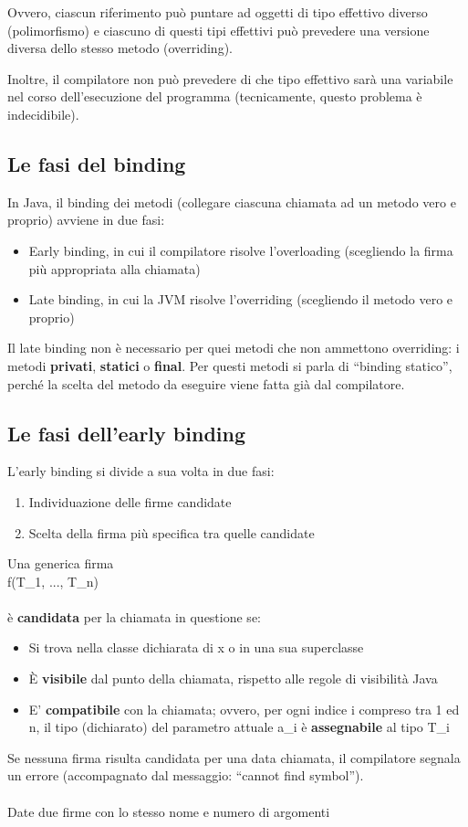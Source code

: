 \documentclass[10pt]{article}
\begin{document}
Ovvero, ciascun riferimento può puntare ad oggetti di tipo effettivo diverso (polimorfismo) e ciascuno di questi tipi effettivi può prevedere una versione diversa dello stesso metodo (overriding). 

Inoltre, il compilatore non può prevedere di che tipo effettivo sarà una variabile nel corso dell'esecuzione del programma (tecnicamente, questo problema è indecidibile).
\subsection{Le fasi del binding}
In Java, il binding dei metodi (collegare ciascuna chiamata ad un metodo vero e proprio) avviene in 
due fasi:
\begin{itemize}
    \item Early binding, in cui il compilatore risolve l'overloading (scegliendo la firma più appropriata alla chiamata)
    \item Late binding, in cui la JVM risolve l'overriding (scegliendo il metodo vero e proprio)
\end{itemize}
Il late binding non è necessario per quei metodi che non ammettono overriding: i metodi \textbf{privati}, \textbf{statici} o \textbf{final}.
Per questi metodi si parla di “binding statico”, perché la scelta del metodo da eseguire viene fatta già dal compilatore.
\subsection{Le fasi dell'early binding}
L'early binding si divide a sua volta in due fasi:
\begin{enumerate}
    \item  Individuazione delle firme candidate
    \item Scelta della firma più specifica tra quelle candidate
\end{enumerate}
Una generica firma\\

f(T\_1, ..., T\_n)\\\\
è \textbf{candidata} per la chiamata in questione se:
\begin{itemize}
    \item Si trova nella classe dichiarata di x o in una sua superclasse
    \item  È \textbf{visibile} dal punto della chiamata, rispetto alle regole di visibilità Java
    \item E' \textbf{compatibile} con la chiamata; ovvero, per ogni indice i compreso tra 1 ed n, il tipo (dichiarato) del parametro attuale a\_i è \textbf{assegnabile} al tipo T\_i
\end{itemize}
Se nessuna firma risulta candidata per una data chiamata, il compilatore segnala un errore (accompagnato dal messaggio: “cannot find symbol”).\\\\
Date due firme con lo stesso nome e numero di argomenti\\
\end{document}
